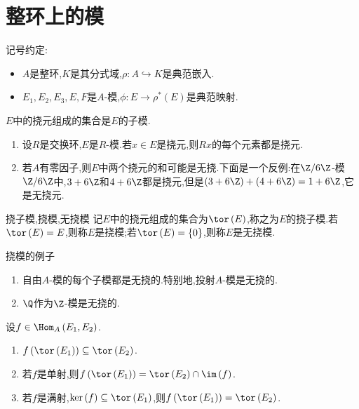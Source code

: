 \section{整环上的模}

记号约定:

\begin{itemize}
	\item $A$是整环,$K$是其分式域,$\rho:A\hookrightarrow K$是典范嵌入.
	\item $E_{1},E_{2},E_{3},E,F$是$A$-模,$\phi:E\to\rho^{\ast}\left(E\right)$是典范映射.
\end{itemize}

\begin{proposition}{}{}
	$E$中的挠元组成的集合是$E$的子模.
\end{proposition}

\begin{remark}{}{}
	\begin{enumerate}
		\item 设$R$是交换环,$E$是$R$-模.若$x\in E$是挠元,则$Rx$的每个元素都是挠元.
		\item 若$A$有零因子,则$E$中两个挠元的和可能是无挠.下面是一个反例:在$\Z/6\Z$-模$\Z/6\Z$中,$3+6\Z$和$4+6\Z$都是挠元,但是$\left(3+6\Z\right)+\left(4+6\Z\right)=1+6\Z$,它是无挠元.
	\end{enumerate}
\end{remark}

\begin{definition}{挠子模,挠模,无挠模}{}
	记$E$中的挠元组成的集合为$\tor\left(E\right)$,称之为$E$的挠子模.若$\tor\left(E\right)=E$,则称$E$是挠模;若$\tor\left(E\right)=\left\{0\right\}$,则称$E$是无挠模.
\end{definition}

\begin{example}{挠模的例子}{}
	\begin{enumerate}
		\item 自由$A$-模的每个子模都是无挠的.特别地,投射$A$-模是无挠的.
		\item $\Q$作为$\Z$-模是无挠的.
	\end{enumerate}
\end{example}

\begin{proposition}{}{}
	设$f\in\Hom_{A}\left(E_{1},E_{2}\right)$.
	\begin{enumerate}
		\item $f\left(\tor\left(E_{1}\right)\right)\subseteq\tor\left(E_{2}\right)$.
		\item 若$f$是单射,则$f\left(\tor\left(E_{1}\right)\right)=\tor\left(E_{2}\right)\cap\im\left(f\right)$.
		\item 若$f$是满射,$\ker\left(f\right)\subseteq\tor\left(E_{1}\right)$,则$f\left(\tor\left(E_{1}\right)\right)=\tor\left(E_{2}\right)$.
	\end{enumerate}
\end{proposition}

